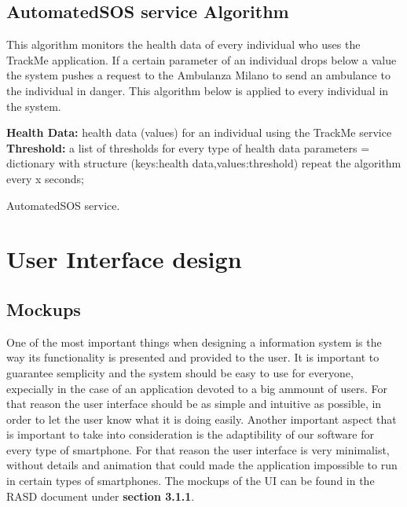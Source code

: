 \documentclass[12pt]{article}
\begin{document}
\newpage

\subsection{AutomatedSOS service Algorithm}
This algorithm monitors the health data of every individual who uses the TrackMe application. If a certain  parameter of an individual drops below a value the system pushes a request to the Ambulanza Milano to send an ambulance to the individual in danger.
This algorithm below is applied to every individual in the system.
\vspace{5mm}

\begin{algorithm}[H]
 \textbf{Health Data:} health data (values) for an individual using the TrackMe service\;
 \vspace{1mm}
  \textbf{Threshold:} a list of thresholds for every type of health data\;
 \vspace{1mm}
 parameters = dictionary with structure (keys:health data,values:threshold)\;\vspace{1mm}
 \noindent {}  
 repeat the algorithm every x seconds;
 
 \vspace{5mm}
 \caption{AutomatedSOS service.}
\end{algorithm}

\newpage
\section{User Interface design}

\subsection{Mockups} One of the most important things when designing a information system is the way its functionality is presented and provided to the user. It is important to guarantee semplicity and the system should be easy to use for everyone, expecially in the case of an application devoted to a big ammount of users. For that reason the user interface should be as simple and intuitive as possible, in order to let the user know what it is doing easily. 
    Another important aspect that is important to take into consideration is the adaptibility of our software for every type of smartphone. For that reason the user interface is very minimalist, without details and animation that could made the application impossible to run in certain types of smartphones. The mockups of the UI can be found in the RASD document under \textbf{section 3.1.1}.
    
\end{document}
